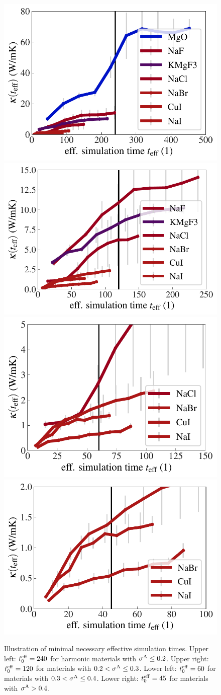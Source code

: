 \begin{figure}
	\includegraphics[width=.49\textwidth]{./data/plots/kappa_convergence/3.pdf}
	\includegraphics[width=.49\textwidth]{./data/plots/kappa_convergence/4.pdf}
	\includegraphics[width=.49\textwidth]{./data/plots/kappa_convergence/5.pdf}
	\includegraphics[width=.49\textwidth]{./data/plots/kappa_convergence/6.pdf}
	\caption{Illustration of minimal necessary effective simulation times. Upper left: $t^{\rm eff}_0 = 240$ for harmonic materials with $\sigma^\mathrm{A} \leq 0.2$. Upper right: $t^{\rm eff}_0 = 120$ for materials with $0.2 < \sigma^\mathrm{A} \leq 0.3$. Lower left: $t^{\rm eff}_0 = 60$ for materials with $0.3 < \sigma^\mathrm{A} \leq 0.4$. Lower right: $t^{\rm eff}_0 = 45$ for materials with $\sigma^\mathrm{A} > 0.4$.}
	\label{fig:kappa_convergence_trustlevel}
\end{figure}


